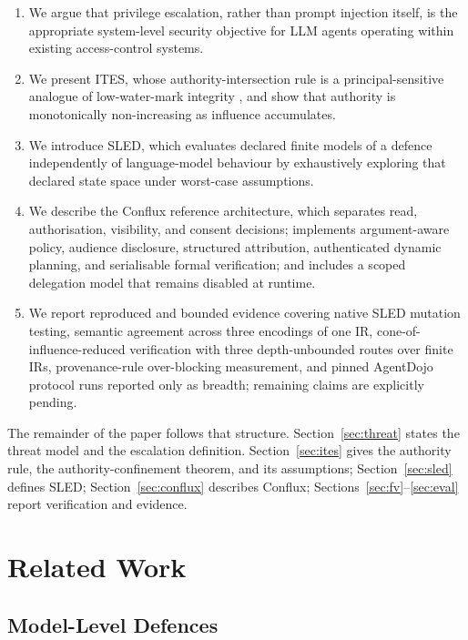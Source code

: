 \documentclass[11pt]{article}
\begin{document}
\begin{enumerate}
  \item We argue that privilege escalation, rather than prompt injection
    itself, is the appropriate system-level security objective for LLM
    agents operating within existing access-control systems.
  \item We present ITES, whose authority-intersection rule is a
    principal-sensitive analogue of low-water-mark integrity
    \citep{biba1977,lomac}, and show that authority is monotonically
    non-increasing as influence accumulates.
  \item We introduce SLED, which evaluates declared finite models of a defence
    independently of language-model behaviour by exhaustively exploring that
    declared state space under worst-case assumptions.
  \item We describe the Conflux reference architecture, which separates read,
    authorisation, visibility, and consent decisions; implements argument-aware
    policy, audience disclosure, structured attribution, authenticated dynamic
    planning, and serialisable formal verification; and includes a scoped
    delegation model that remains disabled at runtime.
  \item We report reproduced and bounded evidence covering native SLED mutation
    testing, semantic agreement across three encodings of one IR,
    cone-of-influence-reduced verification with three depth-unbounded routes
    over finite IRs, provenance-rule over-blocking measurement, and pinned
    AgentDojo protocol runs reported only as breadth; remaining claims are
    explicitly pending.
\end{enumerate}

The remainder of the paper follows that structure.
Section~\ref{sec:threat} states the threat model and the escalation
definition. Section~\ref{sec:ites} gives the authority rule, the
authority-confinement theorem, and its assumptions;
Section~\ref{sec:sled} defines SLED; Section~\ref{sec:conflux} describes
Conflux; Sections~\ref{sec:fv}--\ref{sec:eval} report verification and
evidence.

\section{Related Work}

\subsection{Model-Level Defences}
\end{document}
